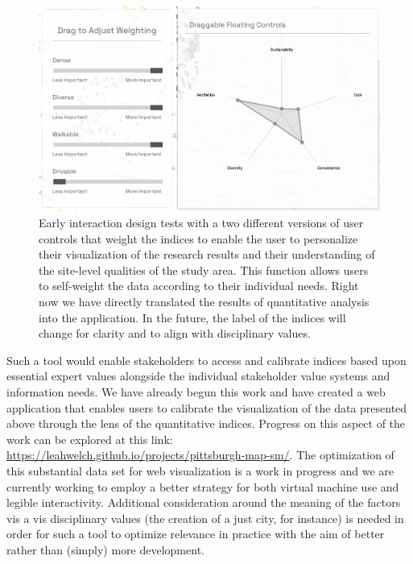 \documentclass[
]{book}
\begin{document}
\begin{figure}
\includegraphics[width=1\linewidth]{04_figures/fig_7b} \caption{Early interaction design tests with a two different versions of user controls that weight the indices to enable the user to personalize their visualization of the research results and their understanding of the site-level qualities of the study area. This function allows users to self-weight the data according to their individual needs. Right now we have directly translated the results of quantitative analysis into the application. In the future, the label of the indices will change for clarity and to align with disciplinary values.}\label{fig:fig7b}
\end{figure}

Such a tool would enable stakeholders to access and calibrate indices based upon essential expert values alongside the individual stakeholder value systems and information needs. We have already begun this work and have created a web application that enables users to calibrate the visualization of the data presented above through the lens of the quantitative indices. Progress on this aspect of the work can be explored at this link: \url{https://leahwelch.github.io/projects/pittsburgh-map-sm/}. The optimization of this substantial data set for web visualization is a work in progress and we are currently working to employ a better strategy for both virtual machine use and legible interactivity. Additional consideration around the meaning of the factors vis a vis disciplinary values (the creation of a just city, for instance) is needed in order for such a tool to optimize relevance in practice with the aim of better rather than (simply) more development.

  
\end{document}
